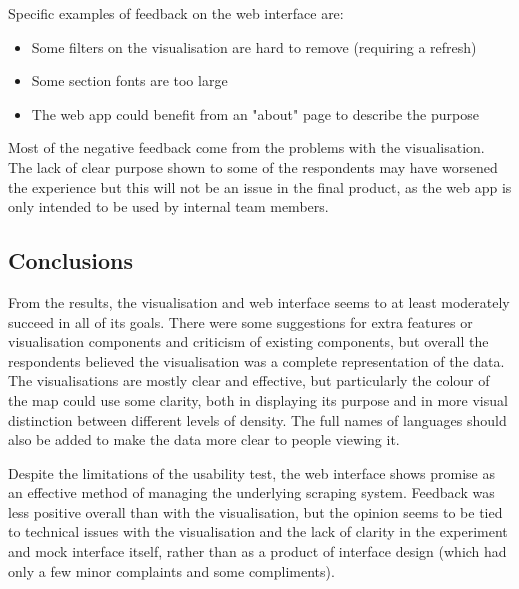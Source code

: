 \documentclass{l4proj}
\begin{document}
Specific examples of feedback on the web interface are:
\begin{itemize}
    \item Some filters on the visualisation are hard to remove (requiring a refresh)
    \item Some section fonts are too large
    \item The web app could benefit from an "about" page to describe the purpose
\end{itemize}

Most of the negative feedback come from the problems with the visualisation. The lack of clear purpose shown to some of the respondents may have worsened the experience but this will not be an issue in the final product, as the web app is only intended to be used by internal team members.

\subsection{Conclusions}
From the results, the visualisation and web interface seems to at least moderately succeed in all of its goals. There were some suggestions for extra features or visualisation components and criticism of existing components, but overall the respondents believed the visualisation was a complete representation of the data. The visualisations are mostly clear and effective, but particularly the colour of the map could use some clarity, both in displaying its purpose and in more visual distinction between different levels of density. The full names of languages should also be added to make the data more clear to people viewing it. \par
Despite the limitations of the usability test, the web interface shows promise as an effective method of managing the underlying scraping system. Feedback was less positive overall than with the visualisation, but the opinion seems to be tied to technical issues with the visualisation and the lack of clarity in the experiment and mock interface itself, rather than as a product of interface design (which had only a few minor complaints and some compliments).
\end{document}
